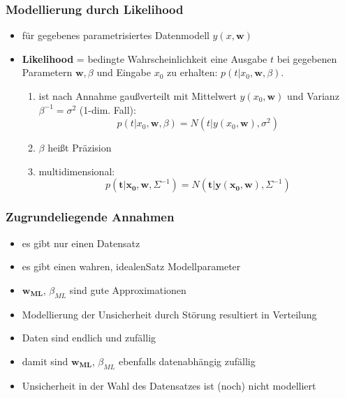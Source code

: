 	\subsubsection*{Modellierung durch Likelihood}
	\begin{itemize}
		\item für gegebenes parametrisiertes Datenmodell $y(x, \pmb{w})$
		\item \textbf{Likelihood} = bedingte Wahrscheinlichkeit eine Ausgabe $t$ bei gegebenen Parametern $\pmb{w}, \beta$ und Eingabe $x_0$ zu erhalten: $p(t\vert x_0, \pmb{w}, \beta)$.\vspace*{-3pt}
		\begin{enumerate}[$\hookrightarrow$]
			\item ist nach Annahme gaußverteilt mit Mittelwert $y(x_0, \pmb{w})$ und Varianz $\beta^{-1}=\sigma^2$ (1-dim. Fall):
			\begin{equation*}
				p(t\vert x_0, \pmb{w}, \beta) = N(t\vert y(x_0,\pmb{w}), \sigma^2)
			\end{equation*}
			\item $\beta$ heißt Präzision
			\item multidimensional:
			\begin{equation*}
				p(\pmb{t}\vert \pmb{x_0}, \pmb{w}, \Sigma^{-1}) = N(\pmb{t}\vert \pmb{y}(\pmb{x_0},\pmb{w}), \Sigma^{-1})
			\end{equation*}
		\end{enumerate}
	\end{itemize}
	\subsubsection{Zugrundeliegende Annahmen}
	\begin{itemize}
		\item es gibt nur einen Datensatz
		\item es gibt einen \dq wahren, idealen\dq Satz Modellparameter
		\item $\pmb{w_{ML}}$, $\beta_{ML}$ sind gute Approximationen
		\item Modellierung der Unsicherheit durch Störung resultiert in Verteilung
		\item Daten sind endlich und zufällig
		\item damit sind $\pmb{w_{ML}}$, $\beta_{ML}$ ebenfalls datenabhängig zufällig
		\item Unsicherheit in der Wahl des Datensatzes ist (noch) nicht modelliert	
	\end{itemize}
